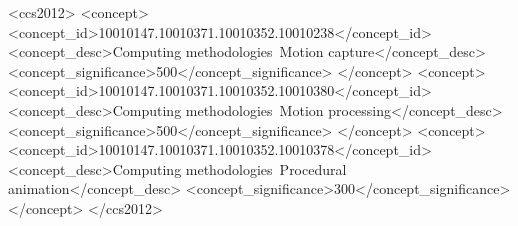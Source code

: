 \begin{CCSXML}
<ccs2012>
   <concept>
       <concept_id>10010147.10010371.10010352.10010238</concept_id>
       <concept_desc>Computing methodologies~Motion capture</concept_desc>
       <concept_significance>500</concept_significance>
       </concept>
   <concept>
       <concept_id>10010147.10010371.10010352.10010380</concept_id>
       <concept_desc>Computing methodologies~Motion processing</concept_desc>
       <concept_significance>500</concept_significance>
       </concept>
   <concept>
       <concept_id>10010147.10010371.10010352.10010378</concept_id>
       <concept_desc>Computing methodologies~Procedural animation</concept_desc>
       <concept_significance>300</concept_significance>
       </concept>
 </ccs2012>
\end{CCSXML}

